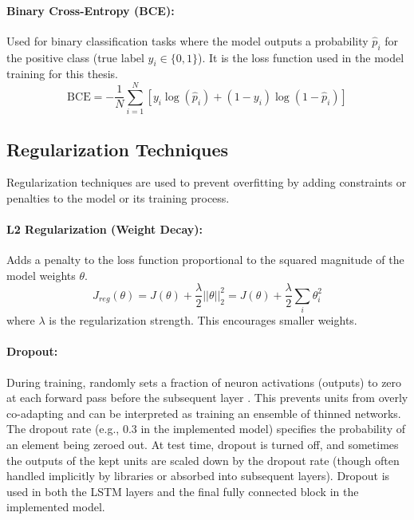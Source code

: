 \paragraph{Binary Cross-Entropy (BCE):}
Used for binary classification tasks where the model outputs a probability \( \hat{p}_i \) for the positive class (true label \( y_i \in \{0, 1\} \)). It is the loss function used in the model training for this thesis.
\begin{equation}
  \text{BCE} = -\frac{1}{N} \sum_{i=1}^N [ y_i \log(\hat{p}_i) + (1 - y_i) \log(1 - \hat{p}_i) ]
\end{equation}


\subsection{Regularization Techniques}
Regularization techniques are used to prevent overfitting by adding constraints or penalties to the model or its training process.

\paragraph{L2 Regularization (Weight Decay):}
Adds a penalty to the loss function proportional to the squared magnitude of the model weights \( \theta \).
\begin{equation}
  J_{reg}(\theta) = J(\theta) + \frac{\lambda}{2} ||\theta||_2^2 = J(\theta) + \frac{\lambda}{2} \sum_i \theta_i^2
\end{equation}
where \( \lambda \) is the regularization strength. This encourages smaller weights.

\paragraph{Dropout:}
During training, randomly sets a fraction of neuron activations (outputs) to zero at each forward pass before the subsequent layer \autocite{srivastava2014dropout}. This prevents units from overly co-adapting and can be interpreted as training an ensemble of thinned networks. The dropout rate (e.g., 0.3 in the implemented model) specifies the probability of an element being zeroed out. At test time, dropout is turned off, and sometimes the outputs of the kept units are scaled down by the dropout rate (though often handled implicitly by libraries or absorbed into subsequent layers). Dropout is used in both the LSTM layers and the final fully connected block in the implemented model.

